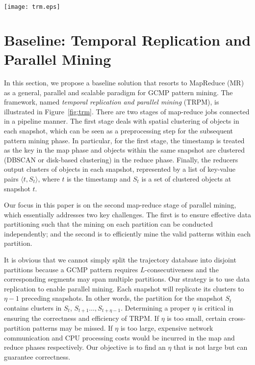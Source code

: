 \begin{figure*} [t]
\center
\texttt{[image: trm.eps]}
\caption{Work flow of Temporal Replication and Parallel Mining (TRPM). (a) and (b) correspond to the first map-reduce stage which clusters objects in each snapshot;  (c) and (d) correspond to the second map-reduce stage, which uses TRPM to detect GCMP in parallel.}
\label{fig:trm}
\end{figure*}

\section{Baseline: Temporal Replication and Parallel Mining}
\label{sec:trm}
In this section, we propose a baseline solution that resorts to MapReduce (MR) as a general, parallel and scalable paradigm for GCMP pattern mining. The framework, named \textit{temporal replication and parallel mining} (TRPM), is illustrated in   Figure~\ref{fig:trm}. There are two stages of map-reduce jobs connected in a pipeline manner. The first stage deals with spatial clustering of objects in each snapshot, which can be seen as a preprocessing step for the subsequent pattern mining phase. In particular, for the first stage, the timestamp is treated as the key in the map phase and objects within the same snapshot are clustered (DBSCAN or disk-based clustering) in the reduce phase. Finally, the reducers output clusters of objects in each snapshot, represented by a list of key-value pairs $\langle t, S_t  \rangle$, where $t$ is the timestamp and $S_t$ is a set of clustered objects at snapshot $t$. 

Our focus in this paper is on the second map-reduce stage of parallel mining, which essentially addresses two key challenges. The first is to ensure effective data partitioning such that the mining on each partition can be conducted independently; and the second is to efficiently mine the valid patterns within each partition. 

It is obvious that we cannot simply split the trajectory database 
into disjoint partitions because a GCMP pattern requires $L$-consecutiveness 
and the corresponding segments may span multiple partitions. 
Our strategy is to use data replication to enable parallel mining. 
Each snapshot will replicate its clusters to $\eta-1$ preceding snapshots.
In other words, the partition for the snapshot $S_t$ contains clusters 
in $S_t$, $S_{t+1}\ldots,S_{t+\eta-1}$. 
Determining a proper $\eta$ is critical in ensuring the
correctness and efficiency of TRPM. If $\eta$ is too small, 
certain cross-partition patterns may be missed. 
If $\eta$ is too large, expensive network communication and 
CPU processing costs would be incurred in the map and reduce phases respectively. Our objective is to find an $\eta$ that is not large but can guarantee correctness.

